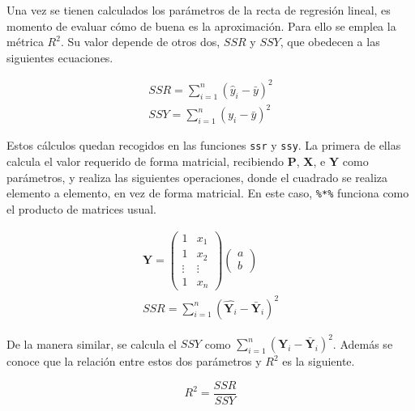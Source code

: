 \documentclass[12pt]{report}\usepackage[]{graphicx}\usepackage[dvipsnames]{xcolor}
\begin{document}
 				Una vez se tienen calculados los parámetros de la recta de regresión lineal, es momento de evaluar cómo de buena es la aproximación. Para ello se emplea la métrica $R^2$. Su valor depende de otros dos, $SSR$ y $SSY$, que obedecen a las siguientes ecuaciones. 
 				
 				$$
 				\begin{gathered}
 					SSR = \sum_{i=1}^n(\hat{y}_i - \bar{y})^2\\
 					SSY = \sum_{i=1}^n(y_i - \bar{y})^2
 				\end{gathered}
 				$$
 				
 				Estos cálculos quedan recogidos en las funciones \texttt{ssr} y \texttt{ssy}. La primera de ellas calcula el valor requerido de forma matricial, recibiendo \textbf{P}, \textbf{X}, e \textbf{Y} como parámetros, y realiza las siguientes operaciones, donde el cuadrado se realiza elemento a elemento, en vez de forma matricial. En este caso, \texttt{\%*\%} funciona como el producto de matrices usual. 
 				
 				$$
 				\begin{gathered}
 					\hat{\textbf{Y}} = \begin{pmatrix}
 						1 & x_1\\
 						1 & x_2\\
 						\vdots & \vdots\\
 						1 & x_n
 					\end{pmatrix}\begin{pmatrix}
 						a\\
 						b
 					\end{pmatrix}\\
 					SSR = \sum_{i=1}^n (\hat{\textbf{Y}_i} - \bar{\textbf{Y}}_i)^2
 				\end{gathered}
 				$$
 				
 				De la manera similar, se calcula el $SSY$ como $\sum_{i=1}^n (\textbf{Y}_i - \bar{\textbf{Y}}_i)^2$. Además se conoce que la relación entre estos dos parámetros y $R^2$ es la siguiente. 
 				
 				$$
 				R^2 = \frac{SSR}{SSY}
 				$$
 				
\end{document}
